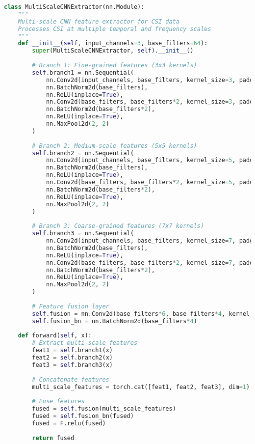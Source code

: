 \documentclass[journal]{IEEEtran}
\begin{document}
\begin{lstlisting}[language=Python, caption=Multi-Scale CNN Implementation]
class MultiScaleCNNExtractor(nn.Module):
    """
    Multi-scale CNN feature extractor for CSI data
    Processes CSI at multiple temporal and frequency scales
    """
    def __init__(self, input_channels=3, base_filters=64):
        super(MultiScaleCNNExtractor, self).__init__()
        
        # Branch 1: Fine-grained features (3x3 kernels)
        self.branch1 = nn.Sequential(
            nn.Conv2d(input_channels, base_filters, kernel_size=3, padding=1),
            nn.BatchNorm2d(base_filters),
            nn.ReLU(inplace=True),
            nn.Conv2d(base_filters, base_filters*2, kernel_size=3, padding=1),
            nn.BatchNorm2d(base_filters*2),
            nn.ReLU(inplace=True),
            nn.MaxPool2d(2, 2)
        )
        
        # Branch 2: Medium-scale features (5x5 kernels)
        self.branch2 = nn.Sequential(
            nn.Conv2d(input_channels, base_filters, kernel_size=5, padding=2),
            nn.BatchNorm2d(base_filters),
            nn.ReLU(inplace=True),
            nn.Conv2d(base_filters, base_filters*2, kernel_size=5, padding=2),
            nn.BatchNorm2d(base_filters*2),
            nn.ReLU(inplace=True),
            nn.MaxPool2d(2, 2)
        )
        
        # Branch 3: Coarse-grained features (7x7 kernels)
        self.branch3 = nn.Sequential(
            nn.Conv2d(input_channels, base_filters, kernel_size=7, padding=3),
            nn.BatchNorm2d(base_filters),
            nn.ReLU(inplace=True),
            nn.Conv2d(base_filters, base_filters*2, kernel_size=7, padding=3),
            nn.BatchNorm2d(base_filters*2),
            nn.ReLU(inplace=True),
            nn.MaxPool2d(2, 2)
        )
        
        # Feature fusion layer
        self.fusion = nn.Conv2d(base_filters*6, base_filters*4, kernel_size=1)
        self.fusion_bn = nn.BatchNorm2d(base_filters*4)
        
    def forward(self, x):
        # Extract multi-scale features
        feat1 = self.branch1(x)
        feat2 = self.branch2(x)
        feat3 = self.branch3(x)
        
        # Concatenate features
        multi_scale_features = torch.cat([feat1, feat2, feat3], dim=1)
        
        # Fuse features
        fused = self.fusion(multi_scale_features)
        fused = self.fusion_bn(fused)
        fused = F.relu(fused)
        
        return fused
\end{lstlisting}
\end{document}
